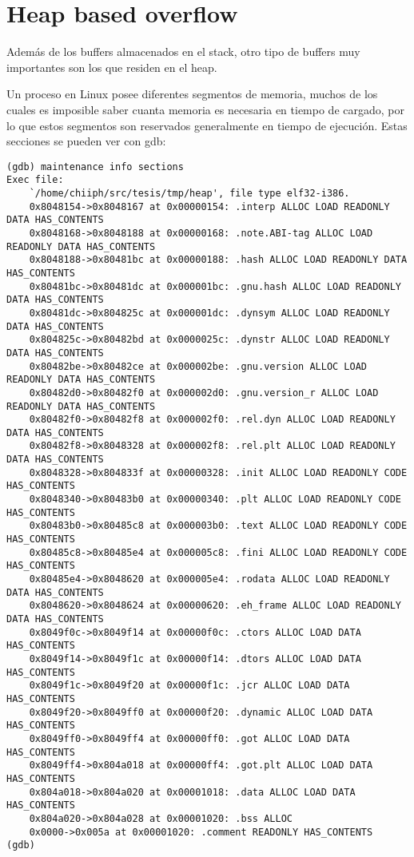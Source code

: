 \section{Heap based overflow}

	Adem\'as de los buffers almacenados en el stack, otro tipo de buffers muy importantes son los que residen en el heap.
	
	Un proceso en Linux posee diferentes segmentos de memoria, muchos de los cuales es imposible saber cuanta memoria es necesaria en tiempo de cargado, por lo que estos segmentos son reservados generalmente en tiempo de ejecuci\'on. Estas secciones se pueden ver con gdb:
	
	\vspace{5 mm}
	
	\begin{lstlisting}
(gdb) maintenance info sections 
Exec file:
    `/home/chiiph/src/tesis/tmp/heap', file type elf32-i386.
    0x8048154->0x8048167 at 0x00000154: .interp ALLOC LOAD READONLY DATA HAS_CONTENTS
    0x8048168->0x8048188 at 0x00000168: .note.ABI-tag ALLOC LOAD READONLY DATA HAS_CONTENTS
    0x8048188->0x80481bc at 0x00000188: .hash ALLOC LOAD READONLY DATA HAS_CONTENTS
    0x80481bc->0x80481dc at 0x000001bc: .gnu.hash ALLOC LOAD READONLY DATA HAS_CONTENTS
    0x80481dc->0x804825c at 0x000001dc: .dynsym ALLOC LOAD READONLY DATA HAS_CONTENTS
    0x804825c->0x80482bd at 0x0000025c: .dynstr ALLOC LOAD READONLY DATA HAS_CONTENTS
    0x80482be->0x80482ce at 0x000002be: .gnu.version ALLOC LOAD READONLY DATA HAS_CONTENTS
    0x80482d0->0x80482f0 at 0x000002d0: .gnu.version_r ALLOC LOAD READONLY DATA HAS_CONTENTS
    0x80482f0->0x80482f8 at 0x000002f0: .rel.dyn ALLOC LOAD READONLY DATA HAS_CONTENTS
    0x80482f8->0x8048328 at 0x000002f8: .rel.plt ALLOC LOAD READONLY DATA HAS_CONTENTS
    0x8048328->0x804833f at 0x00000328: .init ALLOC LOAD READONLY CODE HAS_CONTENTS
    0x8048340->0x80483b0 at 0x00000340: .plt ALLOC LOAD READONLY CODE HAS_CONTENTS
    0x80483b0->0x80485c8 at 0x000003b0: .text ALLOC LOAD READONLY CODE HAS_CONTENTS
    0x80485c8->0x80485e4 at 0x000005c8: .fini ALLOC LOAD READONLY CODE HAS_CONTENTS
    0x80485e4->0x8048620 at 0x000005e4: .rodata ALLOC LOAD READONLY DATA HAS_CONTENTS
    0x8048620->0x8048624 at 0x00000620: .eh_frame ALLOC LOAD READONLY DATA HAS_CONTENTS
    0x8049f0c->0x8049f14 at 0x00000f0c: .ctors ALLOC LOAD DATA HAS_CONTENTS
    0x8049f14->0x8049f1c at 0x00000f14: .dtors ALLOC LOAD DATA HAS_CONTENTS
    0x8049f1c->0x8049f20 at 0x00000f1c: .jcr ALLOC LOAD DATA HAS_CONTENTS
    0x8049f20->0x8049ff0 at 0x00000f20: .dynamic ALLOC LOAD DATA HAS_CONTENTS
    0x8049ff0->0x8049ff4 at 0x00000ff0: .got ALLOC LOAD DATA HAS_CONTENTS
    0x8049ff4->0x804a018 at 0x00000ff4: .got.plt ALLOC LOAD DATA HAS_CONTENTS
    0x804a018->0x804a020 at 0x00001018: .data ALLOC LOAD DATA HAS_CONTENTS
    0x804a020->0x804a028 at 0x00001020: .bss ALLOC
    0x0000->0x005a at 0x00001020: .comment READONLY HAS_CONTENTS
(gdb) 
	\end{lstlisting}
	

